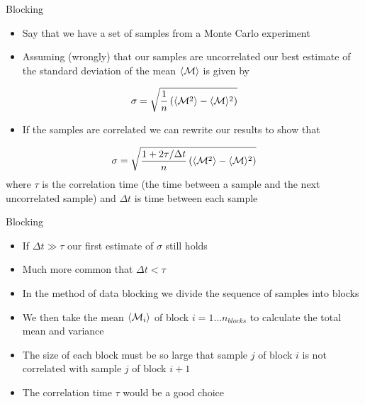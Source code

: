 \documentclass[graybox,sectrefs,envcountresetchap,open=right]{svmonodo}
\begin{document}
 Blocking
\begin{itemize}
    \item Say that we have a set of samples from a Monte Carlo experiment

    \item Assuming (wrongly) that our samples are uncorrelated our best estimate of the standard deviation of the mean $\langle {\cal M}\rangle$ is given by
\end{itemize}

\noindent
\[
\sigma=\sqrt{\frac{1}{n}\left(\langle {\cal M}^2\rangle-\langle {\cal M}\rangle^2\right)} 
\]
\begin{itemize}
    \item If the samples are correlated we can rewrite our results to show  that
\end{itemize}

\noindent
\[
\sigma=\sqrt{\frac{1+2\tau/\Delta t}{n}\left(\langle {\cal M}^2\rangle-\langle {\cal M}\rangle^2\right)}
\]
      where $\tau$ is the correlation time (the time between a sample and the next uncorrelated sample) and $\Delta t$ is time between each sample



 Blocking 
\begin{itemize}
    \item If $\Delta t\gg\tau$ our first estimate of $\sigma$ still holds

    \item Much more common that $\Delta t<\tau$

    \item In the method of data blocking we divide the sequence of samples into blocks

    \item We then take the mean $\langle {\cal M}_i\rangle$ of block $i=1\ldots n_{blocks}$ to calculate the total mean and variance

    \item The size of each block must be so large that sample $j$ of block $i$ is not correlated with sample $j$ of block $i+1$

    \item The correlation time $\tau$ would be a good choice
\end{itemize}
\end{document}
